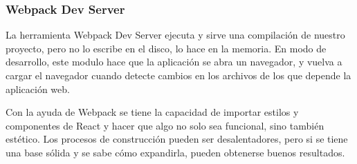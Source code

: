 



\subsubsection{Webpack Dev Server}
La herramienta Webpack Dev Server ejecuta y sirve una compilación de nuestro proyecto, pero no lo escribe en el disco, lo hace en la memoria. En modo de desarrollo, este modulo hace que la aplicación se abra un navegador, y vuelva a cargar el navegador cuando detecte cambios en los archivos de los que depende la aplicación web.
\vspace{0.8cm}



Con la ayuda de Webpack se tiene la capacidad de importar estilos y componentes de React y hacer que algo no solo sea funcional, sino también estético. Los procesos de construcción pueden ser desalentadores, pero si se tiene una base sólida y se sabe cómo expandirla, pueden obtenerse buenos resultados.
\vspace{0.8cm}

